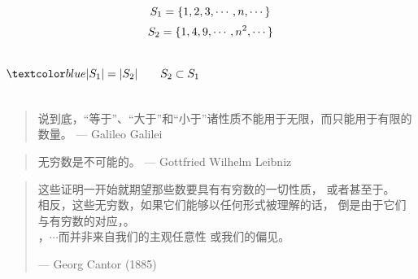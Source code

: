 \begin{frame}{}
  \[
    S_1 = \{1, 2, 3, \cdots, n, \cdots\}
  \]
  \[
    S_2 = \{1, 4, 9, \cdots, n^2, \cdots\}
  \]

  \begin{columns}
      \pause
      \[
	\blue{|S_1| = |S_2| \qquad S_2 \subset S_1}
      \]

      \pause
      \begin{center}
	{}
      \end{center}
      \pause
  \end{columns}

  \pause
  \vspace{0.80cm}
  \begin{quote}
    说到底，``等于''、``大于''和``小于''诸性质不能用于无限，而只能用于有限的数量。 \hfill --- Galileo Galilei
  \end{quote}

  \pause
  \vspace{0.20cm}
  \begin{quote}
    无穷数是不可能的。 \hfill --- Gottfried Wilhelm Leibniz
  \end{quote}
\end{frame}

\begin{frame}{}
  \begin{quote}
    这些证明一开始就期望那些数要具有有穷数的一切性质，
    或者甚至于。\\[15pt]

    相反，这些无穷数，如果它们能够以任何形式被理解的话，
    倒是由于它们与有穷数的对应，。\\[15pt]

    ，$\cdots$而并非来自我们的主观任意性
    或我们的偏见。

    \hfill --- Georg Cantor (1885)
  \end{quote}
\end{frame}

